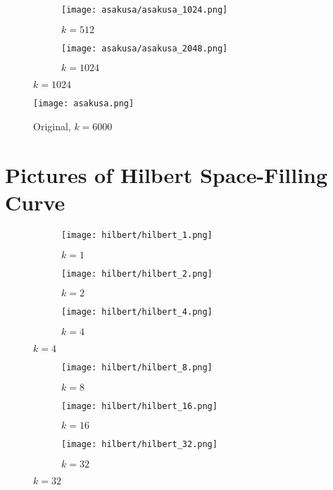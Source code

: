 \documentclass{article}
\begin{document}
\begin{figure}[H]
  \begin{subfigure}{.32\textwidth}
    \centering
    \texttt{[image: asakusa/asakusa\_1024.png]}
    \caption{$k=512$}
  \end{subfigure}
  \begin{subfigure}{.32\textwidth}
    \centering
    \texttt{[image: asakusa/asakusa\_2048.png]}
    \caption{$k=1024$}
  \end{subfigure}
\end{figure}
\begin{figure}[H]
  \centering
  \texttt{[image: asakusa.png]}
  \caption{Original, $k=6000$}
\end{figure}
\clearpage


\section{Pictures of Hilbert Space-Filling Curve}
\begin{figure}[H]
  \begin{subfigure}{.32\textwidth}
    \centering
    \texttt{[image: hilbert/hilbert\_1.png]}
    \caption{$k=1$}
  \end{subfigure}
  \begin{subfigure}{.32\textwidth}
    \centering
    \texttt{[image: hilbert/hilbert\_2.png]}
    \caption{$k=2$}
  \end{subfigure}
  \begin{subfigure}{.32\textwidth}
    \centering
    \texttt{[image: hilbert/hilbert\_4.png]}
    \caption{$k=4$}
  \end{subfigure}
\end{figure}
\begin{figure}[H]
  \begin{subfigure}{.32\textwidth}
    \centering
    \texttt{[image: hilbert/hilbert\_8.png]}
    \caption{$k=8$}
  \end{subfigure}
  \begin{subfigure}{.32\textwidth}
    \centering
    \texttt{[image: hilbert/hilbert\_16.png]}
    \caption{$k=16$}
  \end{subfigure}
  \begin{subfigure}{.32\textwidth}
    \centering
    \texttt{[image: hilbert/hilbert\_32.png]}
    \caption{$k=32$}
  \end{subfigure}
\end{figure}
\end{document}
